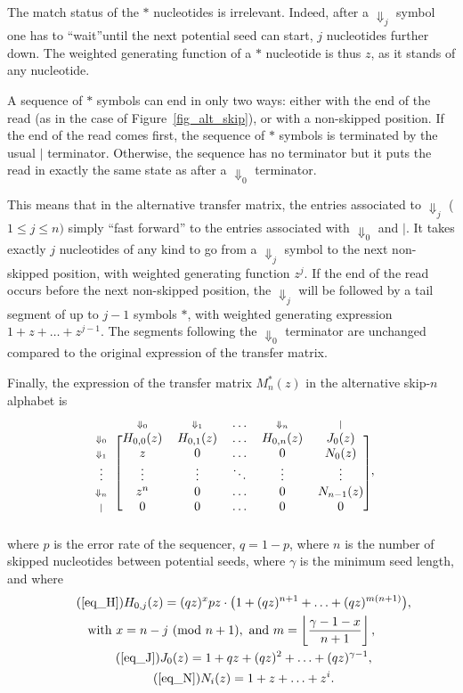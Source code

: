 \documentclass{article}
\newcommand{\Dn}[1]{\scriptstyle{\Downarrow_{#1}}}
\newcommand{\nd}{\scriptstyle{|}}
\newcommand{\modulo}[1]{\ (\mathrm{mod}\ #1)}
\begin{document}
The match status of the $*$ nucleotides is irrelevant. Indeed, after a
$\Downarrow_j$ symbol one has to ``wait''until the next potential seed can
start, $j$ nucleotides further down. The weighted generating function of a
$*$ nucleotide is thus $z$, as it stands of any nucleotide.

A sequence of $*$ symbols can end in only two ways: either with the end of
the read (as in the case of Figure~\ref{fig_alt_skip}), or with a
non-skipped position. If the end of the read comes first, the sequence of
$*$ symbols is terminated by the usual $|$ terminator. Otherwise, the
sequence has no terminator but it puts the read in exactly the same state
as after a $\Downarrow_0$ terminator.

This means that in the alternative transfer matrix, the entries associated
to $\Downarrow_j$ ($1 \leq j \leq n)$ simply ``fast forward'' to the
entries associated with $\Downarrow_0$ and $|$. It takes exactly $j$
nucleotides of any kind to go from a $\Downarrow_j$ symbol to the next
non-skipped position, with weighted generating function $z^j$. If the end
of the read occurs before the next non-skipped position, the
$\Downarrow_j$ will be followed by a tail segment of up to $j-1$ symbols
$*$, with weighted generating expression $1 + z + \ldots + z^{j-1}$. The
segments following the $\Downarrow_0$ terminator are unchanged compared to
the original expression of the transfer matrix.

Finally, the expression of  the transfer matrix $M_n^*(z)$ in the
alternative skip-$n$ alphabet is
\begin{equation}
\label{eq_alt_Mn}
\begin{blockarray}{cccccc}
   & \Dn{0} & \Dn{1} & \ldots & \Dn{n} & \nd \\
\begin{block}{c[ccccc]}
\Dn{0} & H_{0,0}(z) & H_{0,1}(z) & \ldots & H_{0,n}(z) & J_0(z) \\
\Dn{1} & z & 0 & \ldots & 0 & N_0(z) \\
\vdots & \vdots & \vdots & \ddots & \vdots & \vdots \\
\Dn{n} & z^n & 0 & \ldots & 0 & N_{n-1}(z) \\
\nd & 0 & 0 & \ldots & 0 & 0 \\
\end{block}
\end{blockarray},
\end{equation}
where $p$ is the error rate of the sequencer, $q=1-p$, where $n$ is the
number of skipped nucleotides between potential seeds, where $\gamma$ is
the minimum seed length, and where
\begin{gather}
\tag{\ref{eq_H}}
H_{0,j}(z) = (qz)^xpz \cdot \big( 1 + (qz)^{n+1} +
  \ldots + (qz)^{m(n+1)} \big), \\
\notag
  \text{with } x = n-j \modulo{n+1},
  \text{ and } m = \left\lfloor
  \frac{\gamma-1-x}{n+1} \right\rfloor, \\
\tag{\ref{eq_J}}
J_0(z) = 1 + qz + (qz)^2 + \ldots + (qz)^{\gamma-1}, \\
\tag{\ref{eq_N}}
N_i(z) = 1+z+\ldots+z^i.
\end{gather}
\end{document}
